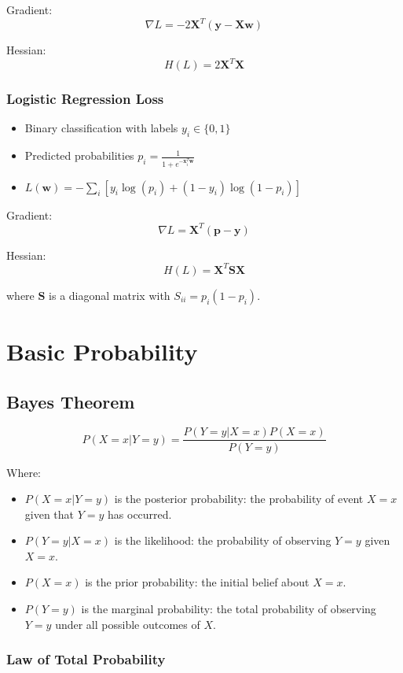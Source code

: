 \documentclass[8pt, a4paper, landscape, includeheadfoot]{extarticle}
\begin{document}
\begin{multicols*}{4}
	Gradient:
	$$
		\nabla L = -2\mathbf{X}^T(\mathbf{y} - \mathbf{X}\mathbf{w})
	$$

	Hessian:
	$$
		H(L) = 2\mathbf{X}^T\mathbf{X}
	$$


	\subsubsection{Logistic Regression Loss}{}

	\begin{itemize}
		\item Binary classification with labels \( y_i \in \{0, 1\} \)
		\item Predicted probabilities \( p_i = \frac{1}{1 + e^{-\mathbf{x}_i^T \mathbf{w}}} \)
		\item \( L(\mathbf{w}) = -\sum_{i}[y_i \log(p_i) + (1-y_i) \log(1 - p_i)] \)
	\end{itemize}

	Gradient:
	$$
		\nabla L = \mathbf{X}^T(\mathbf{p} - \mathbf{y})
	$$

	Hessian:
	$$
		H(L) = \mathbf{X}^T \mathbf{S} \mathbf{X}
	$$

	where \( \mathbf{S} \) is a diagonal matrix with \( S_{ii} = p_i (1 - p_i) \).


	\section{Basic Probability}
	\subsection{Bayes Theorem}

	$$
		P(X{=}x | Y{=}y) = \frac{P(Y{=}y | X{=}x) P(X{=}x)}{P(Y{=}y)}
	$$

	Where:
	\begin{itemize}
		\item $P(X{=}x | Y{=}y)$ is the posterior probability: the probability of event $X{=}x$ given that $Y{=}y$ has occurred.
		\item $P(Y{=}y | X{=}x)$ is the likelihood: the probability of observing $Y{=}y$ given $X{=}x$.
		\item $P(X{=}x)$ is the prior probability: the initial belief about $X{=}x$.
		\item $P(Y{=}y)$ is the marginal probability: the total probability of observing $Y{=}y$ under all possible outcomes of $X$.
	\end{itemize}
	\subsubsection{Law of Total Probability}


\end{multicols*}
\end{document}
